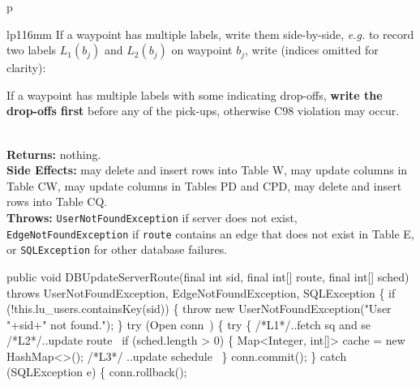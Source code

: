 \documentclass{article}
\theoremstyle{definition}                   %
\begin{document}
\begin{tabular}{p{\textwidth}}
\begin{tabular}{lp{116mm}}
If a waypoint has multiple labels, write them side-by-side, \textit{e.g.}
to record two labels $L_1(b_j)$ and $L_2(b_j)$ on waypoint $b_j$, write
(indices omitted for clarity):


If a waypoint has multiple labels with some indicating drop-offs, \textbf{write
the drop-offs first} before any of the pick-ups, otherwise C98 violation may
occur.
\end{tabular}\\
\textbf{Returns:} nothing.\\
\textbf{Side Effects:} may delete and insert rows into Table W, may
update columns in Table CW, may update columns in Tables PD and CPD,
may delete and insert rows into Table CQ.\\
\textbf{Throws:} {\tt{}UserNotFoundException} if server does not exist,
{\tt{}EdgeNotFoundException} if {\tt{}route} contains an edge that does not exist
in Table E, or {\tt{}SQLException} for other database failures.\\
\bottomrule
\end{tabular}
\nwenddocs{}\endmoddef{}
public void DBUpdateServerRoute(final int sid, final int[] route, final int[] sched)
throws UserNotFoundException, EdgeNotFoundException, SQLException \{
  if (!this.lu_users.containsKey(sid)) \{
    throw new UserNotFoundException("User "+sid+" not found.");
  \}
  try (\LA{}Open \code{}conn\edoc{}~{\nwtagstyle{}}\RA{}) \{
    try \{
/*L1*/\LA{}..fetch \code{}sq\edoc{} and \code{}se\edoc{}~{\nwtagstyle{}}\RA{}
/*L2*/\LA{}..update route~{\nwtagstyle{}}\RA{}
      if (sched.length > 0) \{
        Map<Integer, int[]> cache = new HashMap<>();
/*L3*/  \LA{}..update schedule~{\nwtagstyle{}}\RA{}
      \}
      conn.commit();
    \} catch (SQLException e) \{
      conn.rollback();
\end{document}

